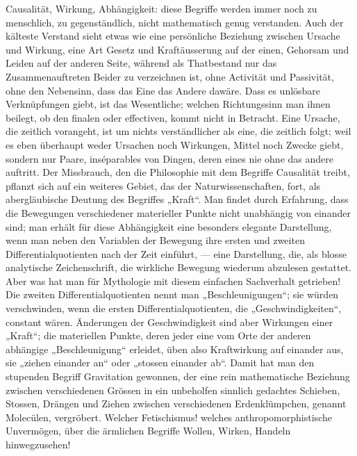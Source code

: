 Causalität, Wirkung, Abhängigkeit: diese Begriffe werden immer noch zu menschlich, zu gegenständlich, nicht mathematisch genug verstanden. Auch der kälteste Verstand sieht etwas wie eine persönliche Beziehung zwischen Ursache und Wirkung, eine Art Gesetz und Kraftäusserung auf der einen, Gehorsam und Leiden auf der anderen Seite, während als Thatbestand nur das Zusammenauftreten Beider zu verzeichnen ist, ohne Activität und Passivität, ohne den Nebensinn, dass das Eine  das Andere dawäre. Dass es unlösbare Verknüpfungen giebt, ist das Wesentliche; welchen Richtungssinn man ihnen beilegt, ob den finalen oder effectiven, kommt nicht in Betracht. Eine Ursache, die zeitlich vorangeht, ist um nichts verständlicher als eine, die zeitlich folgt; weil es eben überhaupt weder Ursachen noch Wirkungen, Mittel noch Zwecke giebt, sondern nur Paare, inséparables von Dingen, deren eines nie ohne das andere auftritt. Der Missbrauch, den die Philosophie mit dem Begriffe Causalität treibt, pflanzt sich auf ein weiteres Gebiet, das der Naturwissenschaften, fort, als abergläubische Deutung des Begriffes „Kraft“. Man findet durch Erfahrung, dass die Bewegungen verschiedener materieller Punkte nicht unabhängig von einander sind; man erhält für diese Abhängigkeit eine besonders elegante Darstellung, wenn man neben den Variablen der Bewegung ihre ersten und zweiten Differentialquotienten nach der Zeit einführt, — eine Darstellung, die, als blosse analytische Zeichenschrift, die wirkliche Bewegung wiederum abzulesen gestattet. Aber was hat man für Mythologie mit diesem einfachen Sachverhalt getrieben! Die zweiten Differentialquotienten nennt man „Beschleunigungen“; sie würden verschwinden, wenn die ersten Differentialquotienten, die „Geschwindigkeiten“, constant wären. Änderungen der Geschwindigkeit sind aber Wirkungen einer „Kraft“; die materiellen Punkte, deren jeder eine vom Orte der anderen abhängige „Beschleunigung“ erleidet, üben also Kraftwirkung auf einander aus, sie „ziehen einander an“ oder „stossen einander ab“. Damit hat man den stupenden Begriff Gravitation gewonnen, der eine rein mathematische Beziehung zwischen verschiedenen Grössen in ein unbeholfen sinnlich gedachtes Schieben, Stossen, Drängen und Ziehen zwischen verschiedenen Erdenklümpchen, genannt Molecülen, vergröbert. Welcher Fetischismus! welches anthropomorphistische Unvermögen, über die ärmlichen Begriffe Wollen, Wirken, Handeln hinwegzusehen!
\par

